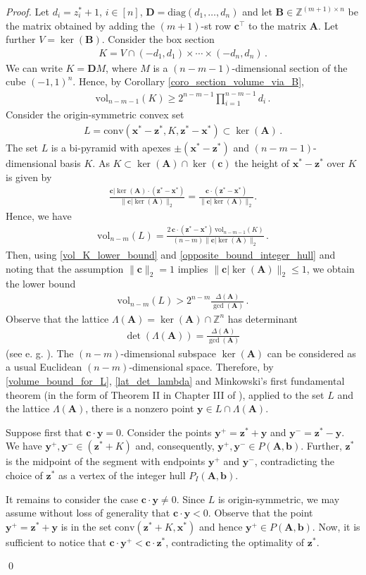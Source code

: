 \documentclass[runningheads]{llncs}
\newcommand{\ve}{\boldsymbol}
\newcommand{\be}{\begin{eqnarray}}
\newcommand{\bea}{\begin{eqnarray*}}
\newcommand{\ee}{\end{eqnarray}}
\newcommand{\eea}{\end{eqnarray*}}
\newcommand{\diag}{\mathrm{diag}}
\newcommand{\conv}{\mathrm{conv}}
\newcommand{\vol}{\mathrm{vol}}
\newcommand{\Z}{\mathbb Z}
\newcommand{\KP}{{P}}
\newcommand{\PKP}{{Q}}
\renewcommand\>{\rangle}
\newcommand\<{\langle}
\newcommand\0{\mathbf{0}}
\newcommand\BB{\ve B}%
\renewcommand\AA{\ve A}%
\newcommand\DD{\ve D}%
\begin{document}
\begin{proof}
Let $d_i=z_i^*+1$, $i\in[n]$, $\DD=\diag(d_1,\ldots, d_n)$ and let $\BB\in\Z^{(m+1)\times n}$ be the matrix obtained by adding the $(m+1)$-st row ${\ve c}^\top$ to the matrix $\AA$. Let further $V=\ker(\BB)$. Consider the box section
\bea
K=V\cap (-d_1, d_1)\times\cdots\times (-d_n, d_n)\,.
\eea
We can write $K=\DD M$, where $M$ is a $(n-m-1)$-dimensional section of the cube $(-1,1)^n$.
Hence, by Corollary \ref{coro_section_volume_via_B},
\be\label{vol_K_lower_bound}
\vol_{n-m-1}(K)\ge 2^{n-m-1}\prod_{i=1}^{n-m-1} d_i\,.
\ee
Consider
the origin-symmetric convex set
\bea
L=\conv({\ve x}^*-{\ve z}^*, K, {\ve z}^*-{\ve x}^*)\subset \ker(\AA)\,.
\eea
%
The set $L$ is a bi-pyramid with apexes $\pm ({\ve x}^*-{\ve z}^*)$ and 
$(n-m-1)$-dimensional basis $K$. As $K\subset \ker(\AA)\cap\ker(\ve c)$
the height of ${\ve x}^*-{\ve z}^*$ over $K$ is given by
\bea
 \frac{{\ve c}|\ker(\AA)\cdot({\ve z}^*-{\ve x}^*)}{\|{\ve c}|{\ker(\AA)}\|_2} =\frac{{\ve c}\cdot({\ve z}^*-{\ve x}^*)}{\|{\ve c}|{\ker(\AA)}\|_2}.
\eea 
Hence, we have 
%
\bea
\vol_{n-m}(L)=\frac{2 \,{\ve c}\cdot({\ve z}^*-{\ve x}^*)\,\vol_{n-m-1}(K)}{(n-m)\|{\ve c}|{\ker(\AA)}\|_2}\,.\eea
Then, using \eqref{vol_K_lower_bound} and \eqref{opposite_bound_integer_hull} and noting that the assumption $\|{\ve c}\|_2= 1$ implies $\|{\ve c}|{\ker(\AA)}\|_2\le 1$, we obtain the lower bound
\be\label{volume_bound_for_L}
\vol_{n-m}(L)>2^{n-m}\frac{\Delta(\AA)}{\gcd(\AA)}\,.
\ee
Observe that the lattice $\Lambda(\AA)=\ker(\AA)\cap\Z^n$ has determinant 
\be\label{lat_det_lambda}
\det(\Lambda(\AA))=\frac{\Delta(\AA)}{\gcd(\AA)}\,
\ee
(see e. g. \cite[Chapter~1, \S 1]{Skolem}). The $(n-m)$-dimensional subspace $\ker(\AA)$ can be considered as a usual Euclidean $(n-m)$-dimensional space.  Therefore, by \eqref{volume_bound_for_L}, \eqref{lat_det_lambda} and Minkowski's first fundamental theorem (in the form of Theorem II in Chapter III of \cite{cassels1996introduction}), applied to the set $L$ and the lattice $\Lambda(\AA)$,  there is a nonzero point ${\ve y}\in L \cap \Lambda(\AA)$. 

Suppose first that ${\ve c}\cdot{\ve y}=0$. Consider the points ${\ve y}^+={\ve z}^*+ {\ve y}$ and ${\ve y}^-={\ve z}^*- {\ve y}$. We have  ${\ve y}^+, {\ve y}^-\in ({\ve z}^*+K)$ and, consequently,  ${\ve y}^+, {\ve y}^-\in \KP(\AA, {\ve b})$.  Further, ${\ve z}^*$ is the midpoint of the segment with endpoints ${\ve y}^+$ and ${\ve y}^-$, contradicting the choice of ${\ve z}^*$ as a vertex of the integer hull $P_I(\AA, {\ve b})$. 

It remains to consider the case ${\ve c}\cdot{\ve y}\neq 0$. Since $L$ is origin-symmetric, we may assume without loss of generality that ${\ve c}\cdot{\ve y}<0$. Observe that the point ${\ve y}^+={\ve z}^*+ {\ve y}$ is in the set $\conv({\ve z}^*+K,{\ve x}^*)$ and hence ${\ve y}^+\in  \KP(\AA, {\ve b})$. Now, it is sufficient to notice that  ${\ve c}\cdot{\ve y}^+<{\ve c}\cdot {\ve z}^*$, contradicting the optimality of ${\ve z}^*$.

\qed\end{proof}
\end{document}

